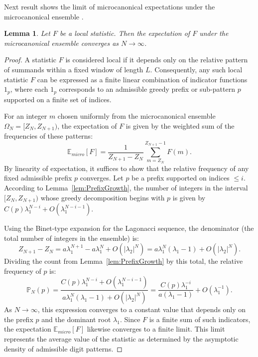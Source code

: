 \documentclass[11pt]{amsart}
\theoremstyle{plain}
\numberwithin{equation}{section} %
\newtheorem{lemma}[thm]{Lemma}
\numberwithin{table}{section} %
\numberwithin{figure}{section}
\begin{document}
	
	
	Next result shows  the limit of microcanonical expectations under the microcanonical ensemble .
	
	\begin{lemma}
		\label{lem:MicroLimit}
		Let $F$ be a local statistic. Then the expectation of $F$ under the
		microcanonical ensemble converges as $N\to\infty$.
	\end{lemma}
	
	\begin{proof}
		A statistic $F$ is considered local if it depends only on the relative pattern of summands within a fixed window of length $L$. Consequently, any such local statistic $F$ can be expressed as a finite linear combination of indicator functions $1_{p}$, where each $1_{p}$ corresponds to an admissible greedy prefix or sub-pattern $p$ supported on a finite set of indices.
		
		For an integer $m$ chosen uniformly from the microcanonical ensemble $\Omega_N = [Z_N, Z_{N+1})$, the expectation of $F$ is given by the weighted sum of the frequencies of these patterns:
		\[
		\mathbb{E}_{micro}[F] = \frac{1}{Z_{N+1} - Z_N} \sum_{m=Z_N}^{Z_{N+1}-1} F(m).
		\]
		By linearity of expectation, it suffices to show that the relative frequency of any fixed admissible prefix $p$ converges. Let $p$ be a prefix supported on indices $\le i$. According to Lemma~\ref{lem:PrefixGrowth}, the number of integers in the interval $[Z_N, Z_{N+1})$ whose greedy decomposition begins with $p$ is given by $C(p) \lambda_1^{N-i} + O(\lambda_1^{N-i-1})$. 
		
		Using the Binet-type expansion for the Lagonacci sequence, the denominator (the total number of integers in the ensemble) is:
		\[
		Z_{N+1} - Z_N = a \lambda_1^{N+1} - a \lambda_1^N + O(|\lambda_2|^N) = a \lambda_1^N (\lambda_1 - 1) + O(|\lambda_2|^N).
		\]
		Dividing the count from Lemma~\ref{lem:PrefixGrowth} by this total, the relative frequency of $p$ is:
		\[
		\mathbb{P}_N(p) = \frac{C(p) \lambda_1^{N-i} + O(\lambda_1^{N-i-1})}{a \lambda_1^N (\lambda_1 - 1) + O(|\lambda_2|^N)} = \frac{C(p) \lambda_1^{-i}}{a (\lambda_1 - 1)} + O(\lambda_1^{-1}).
		\]
		As $N \to \infty$, this expression converges to a constant value that depends only on the prefix $p$ and the dominant root $\lambda_1$. Since $F$ is a finite sum of such indicators, the expectation $\mathbb{E}_{micro}[F]$ likewise converges to a finite limit. This limit represents the average value of the statistic as determined by the asymptotic density of admissible digit patterns.
	\end{proof}
	
\end{document}
